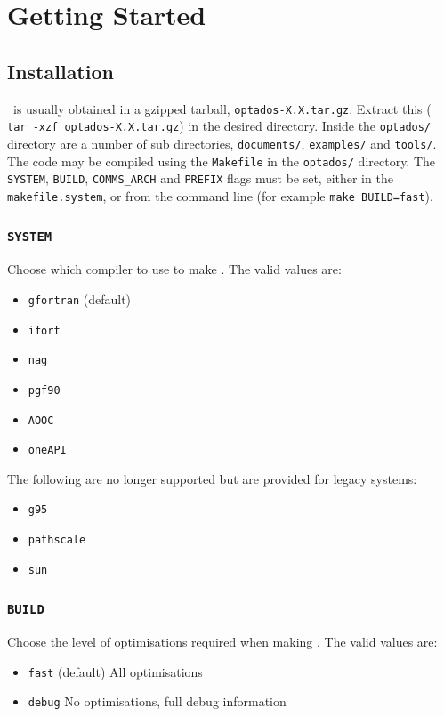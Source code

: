 \documentclass[a4paper,11pt,twoside]{book}
\begin{document}
{\chapter{Getting Started}\label{chap:getting_started}
\section{Installation}
\optados\ is usually obtained in a gzipped tarball, \verb#optados-X.X.tar.gz#. Extract this ( \verb# tar -xzf optados-X.X.tar.gz#) in the desired directory. Inside the  \verb#optados/# directory are a number of sub directories,  \verb#documents/#,   \verb#examples/# and \verb#tools/#.  The code may be compiled using the \verb#Makefile# in the  \verb#optados/# directory.  The \verb#SYSTEM#, \verb#BUILD#, \verb#COMMS_ARCH# and \verb#PREFIX# flags must be set, either in the  \verb#makefile.system#, or from the command line (for example  \verb#make BUILD=fast#).

\subsection[system]{\tt SYSTEM}

Choose which compiler to use to make \optados. The valid values are:
\begin{itemize}
\item[{\bf --}]  \verb#gfortran# (default)
\item[{\bf --}]  \verb#ifort#
\item[{\bf --}]  \verb#nag#
\item[{\bf --}]  \verb#pgf90#
\item[{\bf --}]  \verb#AOOC#
\item[{\bf --}]  \verb#oneAPI#
\end{itemize}

The following are no longer supported but are provided for legacy systems:
\begin{itemize}
\item[{\bf --}]  \verb#g95# 
\item[{\bf --}]  \verb#pathscale#
\item[{\bf --}]  \verb#sun#
\end{itemize}

\subsection[build]{\tt BUILD}

Choose the level of optimisations required when making \optados.  The valid values are:
\begin{itemize}
\item[{\bf --}]  \verb#fast# (default) All optimisations
\item[{\bf --}]  \verb#debug# No optimisations, full debug information
\end{itemize}

}
\end{document}

